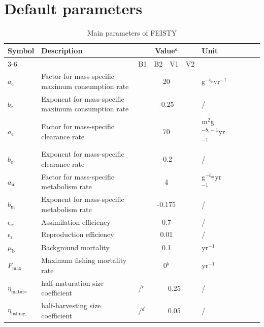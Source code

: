 \documentclass[
]{article}
\begin{document}
\newpage

\section{Default parameters}\label{default-parameters}

\begin{table}[htbp]

\centering
\caption{Main parameters of FEISTY}
\label{tab:defaultparam}

\begin{tabular}{lp{8cm}lp{1cm}lp{1cm}lp{1cm}lp{1cm}l}
\hline
Symbol & Description & \multicolumn{4}{c}{Value$^a$} & Unit \\
                         \cline{3-6}
       &             & \multicolumn{1}{c}{B1} & \multicolumn{1}{c}{B2} & \multicolumn{1}{c}{V1} & \multicolumn{1}{c}{V2} & \\
\hline
$a_\mathrm{c}$ & Factor for mass-specific maximum consumption rate & \multicolumn{4}{c}{20} & g$^{-b_{\mathrm{c}}}$yr$^{-1}$ \\
$b_\mathrm{c}$ & Exponent for mass-specific maximum consumption rate & \multicolumn{4}{c}{-0.25} & / \\
$a_\mathrm{e}$ & Factor for mass-specific clearance rate & \multicolumn{4}{c}{70} & m$^2$g$^{-b_{\mathrm{e}}-1}$yr$^{-1}$ \\
$b_\mathrm{e}$ & Exponent for mass-specific clearance rate & \multicolumn{4}{c}{-0.2} & / \\
$a_\mathrm{m}$ & Factor for mass-specific metabolism rate & \multicolumn{4}{c}{4} & g$^{-b_{\mathrm{m}}}$yr$^{-1}$ \\
$b_\mathrm{m}$ & Exponent for mass-specific metabolism rate & \multicolumn{4}{c}{-0.175} & / \\
$\epsilon_{\mathrm{\alpha}}$ & Assimilation efficiency & \multicolumn{4}{c}{0.7} & / \\
$\epsilon_{\mathrm{r}}$ & Reproduction efficiency & \multicolumn{4}{c}{0.01} & / \\
$\mu_\mathrm{b}$ & Background mortality & \multicolumn{4}{c}{0.1} & yr$^{-1}$ \\
$F_{\mathrm{max}}$ & Maximum fishing mortality rate & \multicolumn{4}{c}{0$^b$} & yr$^{-1}$ \\
$\eta_{\mathrm{mature}}$ & half-maturation size coefficient & /$^c$ & \multicolumn{3}{c}{0.25} & / \\
$\eta_{\mathrm{fishing}}$ & half-harvesting size coefficient & /$^d$ & \multicolumn{3}{c}{0.05} & / \\

\end{tabular}
\end{table}
\end{document}
